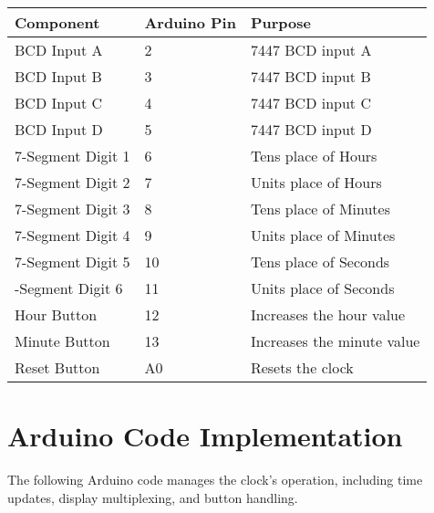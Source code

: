 \documentclass[a4paper,12pt]{article}
\begin{document}
\begin{table}[H]
\centering
\begin{tabular}{|l|l|p{8cm}|}
    \hline
    \textbf{Component} & \textbf{Arduino Pin} & \textbf{Purpose} \\
    \hline
    BCD Input A        & 2                   & 7447 BCD input A \\
    BCD Input B        & 3                   & 7447 BCD input B \\
    BCD Input C        & 4                   & 7447 BCD input C \\
    BCD Input D        & 5                   & 7447 BCD input D \\
    7-Segment Digit 1  & 6                   & Tens place of Hours \\
    7-Segment Digit 2  & 7                   & Units place of Hours \\
    7-Segment Digit 3  & 8                   & Tens place of Minutes \\
    7-Segment Digit 4  & 9                   & Units place of Minutes \\
    7-Segment Digit 5  & 10                  & Tens place of Seconds \\
    -Segment Digit 6  & 11                  & Units place of Seconds \\
    Hour Button        & 12                  & Increases the hour value \\
    Minute Button      & 13                  & Increases the minute value \\
    Reset Button       & A0                  & Resets the clock \\
    \hline
\end{tabular}
\end{table}

\section{Arduino Code Implementation}
The following Arduino code manages the clock's operation, including time updates, display multiplexing, and button handling.
\end{document}
